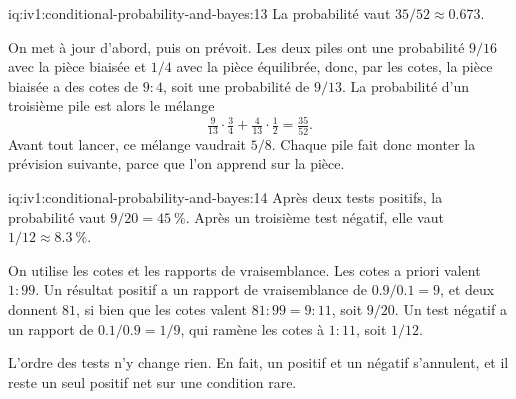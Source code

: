 \begin{solution}{iq:iv1:conditional-probability-and-bayes:13}
La probabilité vaut $35/52 \approx 0.673$.

On met à jour d'abord, puis on prévoit. Les deux piles ont une probabilité $9/16$ avec la pièce biaisée et $1/4$ avec la pièce équilibrée, donc, par les cotes, la pièce biaisée a des cotes de $9 : 4$, soit une probabilité de $9/13$. La probabilité d'un troisième pile est alors le mélange
\[
\tfrac{9}{13} \cdot \tfrac34 + \tfrac{4}{13} \cdot \tfrac12 = \tfrac{35}{52}.
\]
Avant tout lancer, ce mélange vaudrait $5/8$. Chaque pile fait donc monter la prévision suivante, parce que l'on apprend sur la pièce.

\end{solution}

\begin{solution}{iq:iv1:conditional-probability-and-bayes:14}
Après deux tests positifs, la probabilité vaut $9/20 = 45~\%$. Après un troisième test négatif, elle vaut $1/12 \approx 8.3~\%$.

On utilise les cotes et les rapports de vraisemblance. Les cotes a priori valent $1 : 99$. Un résultat positif a un rapport de vraisemblance de $0.9/0.1 = 9$, et deux donnent $81$, si bien que les cotes valent $81 : 99 = 9 : 11$, soit $9/20$. Un test négatif a un rapport de $0.1/0.9 = 1/9$, qui ramène les cotes à $1 : 11$, soit $1/12$.

L'ordre des tests n'y change rien. En fait, un positif et un négatif s'annulent, et il reste un seul positif net sur une condition rare.

\end{solution}

